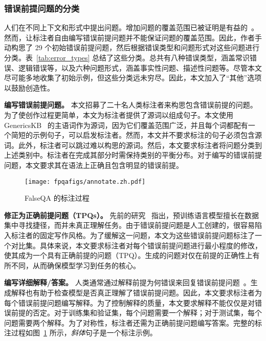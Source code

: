 \subsubsection{错误前提问题的分类}
人们在不同上下文和形式中提出问题。增加问题的覆盖范围已被证明是有益的~\cite{khashabi-etal-2020-unifiedqa}。然而，让标注者自由编写错误前提问题并不能保证问题的覆盖范围。因此，作者手动构思了 29 个初始错误前提问题，然后根据错误类型和问题形式对这些问题进行分类。表~\ref{tab:error_types} 总结了这些分类。总共有八种错误类型，涵盖常识错误、逻辑错误等，以及六种问题形式，涵盖事实性问题、描述性问题等。尽管本文尽可能多地收集了初始示例，但这些分类远未穷尽。因此，本文加入了“其他”选项以鼓励创造性。

\textbf{编写错误前提问题。} 本文招募了二十名人类标注者来构思包含错误前提的问题。为了使创作过程更简单，本文为标注者提供了源词以组成句子。本文使用 GenericsKB~\cite{bhakthavatsalam2020genericskb} 的主语词作为源词，因为它们覆盖范围广泛，并且每个词都配有一个简短的示例句子，可以启发标注者。然而，本文并不要求标注的句子必须包含源词。此外，标注者可以跳过难以构思的源词。然后，本文要求标注者将问题分类到上述类别中。标注者在完成其部分时需保持类别的平衡分布。对于编写的错误前提问题，本文要求其在语法上正确且包含明显的错误前提。



\begin{figure}[!htbp]
    \centering
    \texttt{[image: fpqafigs/annotate.zh.pdf]}
    \caption{FalseQA 的标注过程}
    \label{fig:annotateprocess}
\end{figure}

\textbf{修正为正确前提问题（TPQs）。} 先前的研究~\cite{du-etal-2021-towards} 指出，预训练语言模型擅长在数据集中寻找捷径，而并未真正理解任务。由于错误前提问题是人工创建的，很容易陷入标注者的固定写作风格。为了缓解这一问题，本文为这些错误前提问题标注了一个对比集。具体来说，本文要求标注者对每个错误前提问题进行最小程度的修改，使其成为一个具有正确前提的问题（TPQ）。生成的问题对仅在前提的正确性上有所不同，从而确保模型学习到任务的核心。

\textbf{编写详细解释/答案。} 人类通常通过解释前提为何错误来回复错误前提问题~\cite{kaplan1978indirect}。生成解释也有助于检查模型是否真正理解了错误前提问题。因此，本文要求标注者为每个错误前提问题编写解释。为了控制解释的质量，本文要求解释不能仅仅是对错误前提的否定。对于训练集和验证集，每个问题需要一个解释；对于测试集，每个问题需要两个解释。为了对称性，标注者还需为正确前提问题编写答案。完整的标注过程如图~\ref{fig:annotateprocess} 所示，\textit{斜体}句子是一个标注示例。

